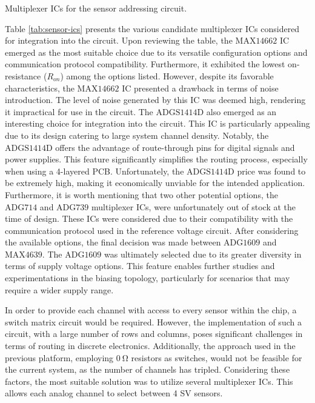 \begin{table}[ht]
    \centering
    \caption{Multiplexer ICs for the sensor addressing circuit.}
    \begin{small}
    
    \end{small}
    \label{tab:sensor-ics}
\end{table}

Table \ref{tab:sensor-ics} presents the various candidate multiplexer \ac{IC}s considered for integration into the circuit. Upon reviewing the table, the $\mathrm{MAX14662}$ \ac{IC} emerged as the most suitable choice due to its versatile configuration options and communication protocol compatibility. Furthermore, it exhibited the lowest on-resistance ($R_{on}$) among the options listed. However, despite its favorable characteristics, the $\mathrm{MAX14662}$ \ac{IC} presented a drawback in terms of noise introduction. The level of noise generated by this \ac{IC} was deemed high, rendering it impractical for use in the circuit. The $\mathrm{ADGS1414D}$ also emerged as an interesting choice for integration into the circuit. This \ac{IC} is particularly appealing due to its design catering to large system channel density. Notably, the $\mathrm{ADGS1414D}$ offers the advantage of route-through pins for digital signals and power supplies. This feature significantly simplifies the routing process, especially when using a 4-layered \ac{PCB}. Unfortunately, the $\mathrm{ADGS1414D}$ price was found to be extremely high, making it economically unviable for the intended application. Furthermore, it is worth mentioning that two other potential options, the $\mathrm{ADG714}$ and $\mathrm{ADG739}$ multiplexer \ac{IC}s, were unfortunately out of stock at the time of design. These \ac{IC}s were considered due to their compatibility with the communication protocol used in the reference voltage circuit. After considering the available options, the final decision was made between $\mathrm{ADG1609}$ and $\mathrm{MAX4639}$. The $\mathrm{ADG1609}$ was ultimately selected due to its greater diversity in terms of supply voltage options. This feature enables further studies and experimentations in the biasing topology, particularly for scenarios that may require a wider supply range.

In order to provide each channel with access to every sensor within the chip, a switch matrix circuit would be required. However, the implementation of such a circuit, with a large number of rows and columns, poses significant challenges in terms of routing in discrete electronics. Additionally, the approach used in the previous platform, employing $\mathrm{0~\Omega}$ resistors as switches, would not be feasible for the current system, as the number of channels has tripled. Considering these factors, the most suitable solution was to utilize several multiplexer \ac{IC}s. This allows each analog channel to select between 4 \ac{SV} sensors.

